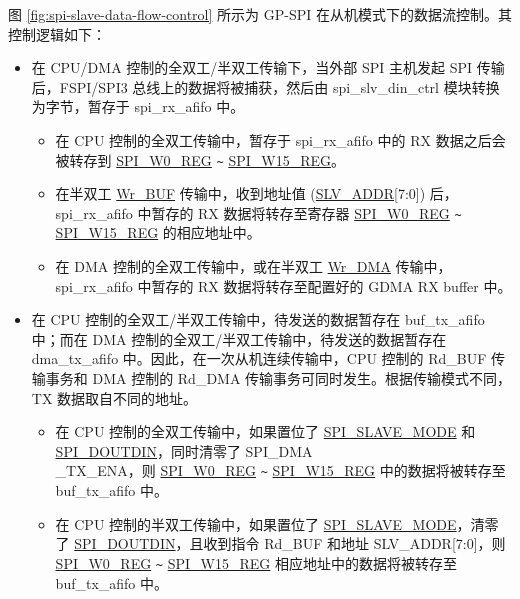 \documentclass[main\_\_CN.tex]{subfiles}
\begin{document}
图  \ref{fig:spi-slave-data-flow-control} 所示为 GP-SPI 在从机模式下的数据流控制。其控制逻辑如下：
\begin{itemize}
    \item 在 CPU/DMA 控制的全双工/半双工传输下，当外部 SPI 主机发起 SPI 传输后，FSPI/SPI3 总线上的数据将被捕获，然后由 spi\_slv\_din\_ctrl 模块转换为字节，暂存于 spi\_rx\_afifo 中。
    \begin{itemize}
        \item 在 CPU 控制的全双工传输中，暂存于 spi\_rx\_afifo 中的 RX 数据之后会被转存到  \hyperref[regdesc:SPIW0REG]{SPI\_W0\_REG} \verb+~+ \hyperref[regdesc:SPIW15REG]{SPI\_W15\_REG}。

        \item 在半双工  \hyperref[cmd:wrbuf]{Wr\_BUF} 传输中，收到地址值 (\hyperref[regdesc:SPIW0REG]{SLV\_ADDR}[7:0]) 后，spi\_rx\_afifo 中暂存的 RX 数据将转存至寄存器  \hyperref[regdesc:SPIW0REG]{SPI\_W0\_REG}  \verb+~+ \hyperref[regdesc:SPIW15REG]{SPI\_W15\_REG} 的相应地址中。

        \item 在 DMA 控制的全双工传输中，或在半双工  \hyperref[cmd:wrdma]{Wr\_DMA} 传输中，spi\_rx\_afifo 中暂存的 RX 数据将转存至配置好的 GDMA RX buffer 中。

    \end{itemize}

    \item 在 CPU 控制的全双工/半双工传输中，待发送的数据暂存在 buf\_tx\_afifo 中；而在 DMA 控制的全双工/半双工传输中，待发送的数据暂存在 dma\_tx\_afifo 中。因此，在一次从机连续传输中，CPU 控制的 Rd\_BUF 传输事务和 DMA 控制的 Rd\_DMA 传输事务可同时发生。根据传输模式不同，TX 数据取自不同的地址。
    \begin{itemize}
        \item 在 CPU 控制的全双工传输中，如果置位了  \hyperref[fielddesc:SPISLAVEMODE]{SPI\_SLAVE\_MODE} 和 \hyperref[fielddesc:SPIDOUTDIN]{SPI\_DOUTDIN}，同时清零了 SPI\_DMA\\\_TX\_ENA，则  \hyperref[regdesc:SPIW0REG]{SPI\_W0\_REG} \verb+~+ \hyperref[regdesc:SPIW15REG]{SPI\_W15\_REG} 中的数据将被转存至 buf\_tx\_afifo 中。

        \item 在 CPU 控制的半双工传输中，如果置位了  \hyperref[fielddesc:SPISLAVEMODE]{SPI\_SLAVE\_MODE}，清零了  \hyperref[fielddesc:SPIDOUTDIN]{SPI\_DOUTDIN}，且收到指令 Rd\_BUF 和地址 SLV\_ADDR[7:0]，则  \hyperref[regdesc:SPIW0REG]{SPI\_W0\_REG} \verb+~+ \hyperref[regdesc:SPIW15REG]{SPI\_W15\_REG} 相应地址中的数据将被转存至 buf\_tx\_afifo 中。


\end{itemize}
\end{itemize}
\end{document}
